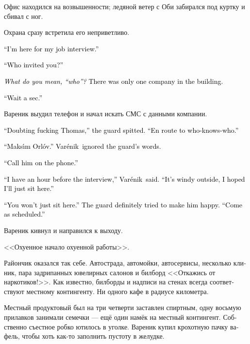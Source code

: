 \documentclass[a5paper,12pt,fleqn]{extbook}\usepackage{cooltooltips}\usepackage{polyglossia}\setdefaultlanguage[babelshorthands=true]{russian}\setotherlanguage{english}\defaultfontfeatures{Ligatures=TeX,Mapping=tex-text} \usepackage{xcolor}\definecolor{lightgray}{HTML}{bbbbbb}\color{lightgray}\newcommand{\ml}[3]{\textenglish{\textcolor{black}{#3}}}
\newcommand{\Varenik}{Var\'enik}
\newcommand{\MaksimOrlov}{Maks\'{\i}m Orl\'ov}
\begin{document}
Офис находился на возвышенности;
ледяной ветер с Оби забирался под куртку и сбивал с ног.

Охрана сразу встретила его неприветливо.

\ml{$0$}
{--- Я на собеседование.}
{``I'm here for my job interview.''}

\ml{$0$}
{--- К кому?}
{``Who invited you?''}

\ml{$0$}
{<<В смысле --- к кому?>>}
{\textit{What do you mean, ``who''?}}
\ml{$0$}
{В здании находилась только одна компания.}
{There was only one company in the building.}

\ml{$0$}
{--- Щас.}
{``Wait a sec.''}

Вареник выудил телефон и начал искать СМС с данными компании.

\ml{$0$}
{--- Фома Непомнящий, блядь, --- плюнул охранник.}
{``Doubting fucking Thomas,'' the guard spitted.}
\ml{$0$}
{--- Идёт, а к кому --- не помнит.}
{``En route to who-knows-who.''}

\ml{$0$}
{--- Максим Орлов, --- сказал Вареник, проигнорировав реплику.}
{``\MaksimOrlov.'' \Varenik\ ignored the guard's words.}

\ml{$0$}
{--- Ну так и звоните ему.}
{``Call him on the phone.''}

\ml{$0$}
{--- До собеседования ещё час, --- сказал Вареник.}
{``I have an hour before the interview,'' \Varenik\ said.}
\ml{$0$}
{--- На улице ветрено, и я думал, просто посижу здесь.}
{``It's windy outside, I hoped I'll just sit here.''}

\ml{$0$}
{--- Здесь вы не посидите, --- обрадовал его охранник.}
{``You won't just sit here.'' The guard definitely tried to make him happy.}
\ml{$0$}
{--- Приходите ко времени.}
{``Come as scheduled.''}

Вареник кивнул и направился к выходу.

<<Охуенное начало охуенной работы>>.

Райончик оказался так себе.
Автострада, автомойки, автосервисы, несколько клиник, пара задрипанных ювелирных салонов и билборд <<Откажись от наркотиков!>>.
Как известно, билборды и надписи на стенах всегда соответствуют местному контингенту.
Ни одного кафе в радиусе километра.

Местный продуктовый был на три четверти заставлен спиртным, одну восьмую прилавков занимали семечки --- ещё один намёк на местный контингент.
Собственно съестное робко ютилось в уголке.
Вареник купил крохотную пачку вафель, чтобы хоть как-то заполнить пустоту в желудке.
\end{document}
